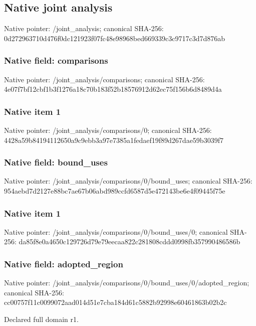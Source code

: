 \documentclass[10pt,a4paper]{article}
\begin{document}
\subsection{Native joint analysis}
Native pointer: /joint\_\allowbreak{}analysis; canonical SHA-256: 0d272963710d476f0dc121923f07fc48e98968bed669339c3c9717c3d7d876ab

\subsubsection{Native field: comparisons}
Native pointer: /joint\_\allowbreak{}analysis/comparisons; canonical SHA-256: 4e07f7bf12cbf1b3f1276a18c70b183f52b18576912d62ec75f156b6d8489d4a

\subsubsection{Native item 1}
Native pointer: /joint\_\allowbreak{}analysis/comparisons/0; canonical SHA-256: 4428a59b84194112650a9c9ebb3a97e7385a1fedaef19f89d267dae59b3039f7

\subsubsection{Native field: bound\_\allowbreak{}uses}
Native pointer: /joint\_\allowbreak{}analysis/comparisons/0/bound\_\allowbreak{}uses; canonical SHA-256: 954aebd7d2127e88bc7ae67b06abd989ccfd6587d5e472143be6e4f09445f75e

\subsubsection{Native item 1}
Native pointer: /joint\_\allowbreak{}analysis/comparisons/0/bound\_\allowbreak{}uses/0; canonical SHA-256: da85f8e0a4650c129726d79e79eecaa822c281808cddd0998fb357990486586b

\subsubsection{Native field: adopted\_\allowbreak{}region}
Native pointer: /joint\_\allowbreak{}analysis/comparisons/0/bound\_\allowbreak{}uses/0/adopted\_\allowbreak{}region; canonical SHA-256: cc00757f11c0099072aad014d51e7cba184d61c5882b92998e60461863b02b2c

\begingroup\raggedright\sloppy Declared full domain r1.\par\endgroup
\end{document}
